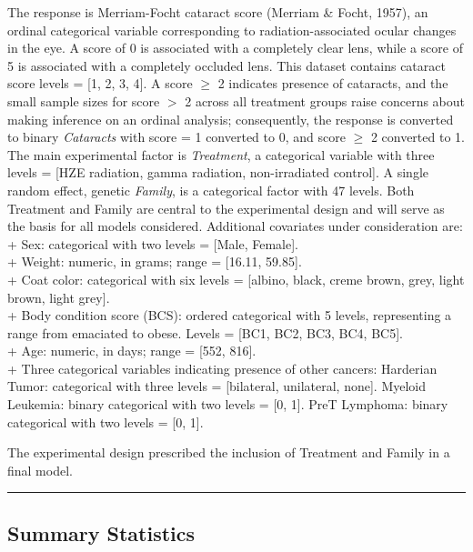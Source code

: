 \documentclass[
]{article}
\begin{document}
The response is Merriam-Focht cataract score (Merriam \& Focht, 1957),
an ordinal categorical variable corresponding to radiation-associated
ocular changes in the eye. A score of 0 is associated with a completely
clear lens, while a score of 5 is associated with a completely occluded
lens. This dataset contains cataract score levels = {[}1, 2, 3, 4{]}. A
score \(\ge\) 2 indicates presence of cataracts, and the small sample
sizes for score \(>\) 2 across all treatment groups raise concerns about
making inference on an ordinal analysis; consequently, the response is
converted to binary \emph{Cataracts} with score = 1 converted to 0, and
score \(\ge\) 2 converted to 1. The main experimental factor is
\emph{Treatment}, a categorical variable with three levels = {[}HZE
radiation, gamma radiation, non-irradiated control{]}. A single random
effect, genetic \emph{Family}, is a categorical factor with 47 levels.
Both Treatment and Family are central to the experimental design and
will serve as the basis for all models considered. Additional covariates
under consideration are:\\
+ Sex: categorical with two levels = {[}Male, Female{]}.\\
+ Weight: numeric, in grams; range = {[}16.11, 59.85{]}.\\
+ Coat color: categorical with six levels = {[}albino, black, creme
brown, grey, light brown, light grey{]}.\\
+ Body condition score (BCS): ordered categorical with 5 levels,
representing a range from emaciated to obese. Levels = {[}BC1, BC2, BC3,
BC4, BC5{]}.\\
+ Age: numeric, in days; range = {[}552, 816{]}.\\
+ Three categorical variables indicating presence of other cancers:
Harderian Tumor: categorical with three levels = {[}bilateral,
unilateral, none{]}. Myeloid Leukemia: binary categorical with two
levels = {[}0, 1{]}. PreT Lymphoma: binary categorical with two levels =
{[}0, 1{]}.

The experimental design prescribed the inclusion of Treatment and Family
in a final model.

\begin{center}\rule{0.5\linewidth}{0.5pt}\end{center}

\hypertarget{summary-statistics}{%
\subsection{Summary Statistics}\label{summary-statistics}}
\end{document}

